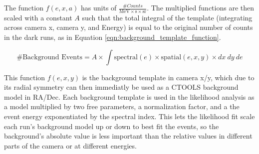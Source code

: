     The function $f(e,x,a)$ has units of $\frac{\# Counts}{ \textrm{MeV} \times \textrm{s} \times \textrm{sr} }$.
    The multiplied functions are then scaled with a constant $A$ such that the total integral of the template (integrating across camera x, camera y, and Energy) is equal to the original number of counts in the dark runs, as in Equation \ref{eqn:background_template_function}.
    
    \begin{equation}\label{eqn:background_template_function}
      \textrm{\# Background Events} = A \times \int \textrm{spectral}(e) \times \textrm{spatial}(e,x,y) \times dx \: dy \: de
    \end{equation}

    This function $f(e,x,y)$ is the background template in camera x/y, which due to its radial symmetry can then immediatly be used as a CTOOLS background model in RA/Dec.
    Each background template is used in the likelihood analysis as a model multiplied by two free parameters, a normalization factor, and a the event energy exponentiated by the spectral index.
    This lets the likelihood fit scale each run's background model up or down to best fit the events, so the background's absolute value is less important than the relative values in different parts of the camera or at different energies.
  
  \FloatBarrier

